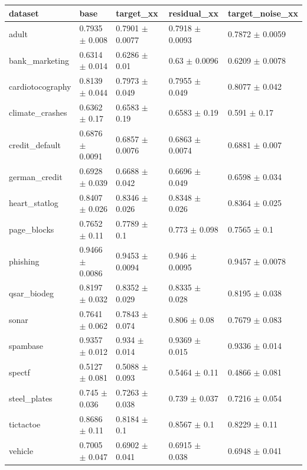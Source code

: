 \begin{tabular}{lllll}
\toprule
dataset & base & target\_xx & residual\_xx & target\_noise\_xx \\
\midrule
adult & 0.7935 $\pm$ 0.008 & 0.7901 $\pm$ 0.0077 & 0.7918 $\pm$ 0.0093 & 0.7872 $\pm$ 0.0059 \\
bank\_marketing & 0.6314 $\pm$ 0.014 & 0.6286 $\pm$ 0.01 & 0.63 $\pm$ 0.0096 & 0.6209 $\pm$ 0.0078 \\
cardiotocography & 0.8139 $\pm$ 0.044 & 0.7973 $\pm$ 0.049 & 0.7955 $\pm$ 0.049 & 0.8077 $\pm$ 0.042 \\
climate\_crashes & 0.6362 $\pm$ 0.17 & 0.6583 $\pm$ 0.19 & 0.6583 $\pm$ 0.19 & 0.591 $\pm$ 0.17 \\
credit\_default & 0.6876 $\pm$ 0.0091 & 0.6857 $\pm$ 0.0076 & 0.6863 $\pm$ 0.0074 & 0.6881 $\pm$ 0.007 \\
german\_credit & 0.6928 $\pm$ 0.039 & 0.6688 $\pm$ 0.042 & 0.6696 $\pm$ 0.049 & 0.6598 $\pm$ 0.034 \\
heart\_statlog & 0.8407 $\pm$ 0.026 & 0.8346 $\pm$ 0.026 & 0.8348 $\pm$ 0.026 & 0.8364 $\pm$ 0.025 \\
page\_blocks & 0.7652 $\pm$ 0.11 & 0.7789 $\pm$ 0.1 & 0.773 $\pm$ 0.098 & 0.7565 $\pm$ 0.1 \\
phishing & 0.9466 $\pm$ 0.0086 & 0.9453 $\pm$ 0.0094 & 0.946 $\pm$ 0.0095 & 0.9457 $\pm$ 0.0078 \\
qsar\_biodeg & 0.8197 $\pm$ 0.032 & 0.8352 $\pm$ 0.029 & 0.8335 $\pm$ 0.028 & 0.8195 $\pm$ 0.038 \\
sonar & 0.7641 $\pm$ 0.062 & 0.7843 $\pm$ 0.074 & 0.806 $\pm$ 0.08 & 0.7679 $\pm$ 0.083 \\
spambase & 0.9357 $\pm$ 0.012 & 0.934 $\pm$ 0.014 & 0.9369 $\pm$ 0.015 & 0.9336 $\pm$ 0.014 \\
spectf & 0.5127 $\pm$ 0.081 & 0.5088 $\pm$ 0.093 & 0.5464 $\pm$ 0.11 & 0.4866 $\pm$ 0.081 \\
steel\_plates & 0.745 $\pm$ 0.036 & 0.7263 $\pm$ 0.038 & 0.739 $\pm$ 0.037 & 0.7216 $\pm$ 0.054 \\
tictactoe & 0.8686 $\pm$ 0.11 & 0.8184 $\pm$ 0.1 & 0.8567 $\pm$ 0.1 & 0.8229 $\pm$ 0.11 \\
vehicle & 0.7005 $\pm$ 0.047 & 0.6902 $\pm$ 0.041 & 0.6915 $\pm$ 0.038 & 0.6948 $\pm$ 0.041 \\
\bottomrule
\end{tabular}

